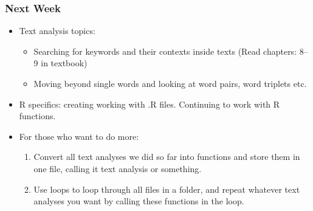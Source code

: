 \documentclass{beamer}
\begin{document}
\begin{frame}
\frametitle{Next Week}
\begin{itemize}
\item Text analysis topics: 
\begin{itemize}
\item Searching for keywords and their contexts inside texts (Read chapters: 8--9 in textbook)
\item Moving beyond single words and looking at word pairs, word triplets etc.
\end{itemize}
\item R specifics: creating working with .R files. Continuing to work with R functions.  
\item For those who want to do more: 
\begin{enumerate}
\item Convert all text analyses we did so far into functions and store them in one file, calling it text analysis or something.
\item Use loops to loop through all files in a folder, and repeat whatever text analyses you want by calling these functions in the loop.
\end{enumerate}
\end{itemize}
\end{frame}
\end{document}

